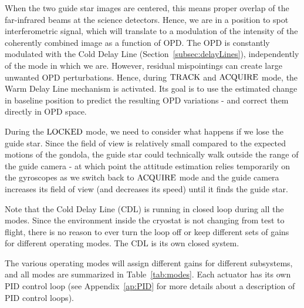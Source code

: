 When the two guide star images are centered, this means proper overlap of the far-infrared beams at the science detectors. Hence, we are in a position to spot interferometric signal, which will translate to a modulation of the intensity of the coherently combined image as a function of OPD. The OPD is constantly modulated with the Cold Delay Line (Section~\ref{subsec:delayLines}), independently of the mode in which we are. However, residual mispointings can create large unwanted OPD perturbations. Hence, during $\textrm{TRACK}$ and $\textrm{ACQUIRE}$ mode, the Warm Delay Line mechanism is activated. Its goal is to use the estimated change in baseline position to predict the resulting OPD variations - and correct them directly in OPD space. 

During the $\textrm{LOCKED}$ mode, we need to consider what happens if we lose the guide star. Since the field of view is relatively small compared to the expected motions of the gondola, the guide star could technically walk outside the range of the guide camera - at which point the attitude estimation relies temporarily on the gyroscopes as we switch back to $\textrm{ACQUIRE}$ mode and the guide camera increases its field of view (and decreases its speed) until it finds the guide star.



Note that the Cold Delay Line (CDL) is running in closed loop during all the modes. Since the environment inside the cryostat is not changing from test to flight, there is no reason to ever turn the loop off or keep different sets of gains for different operating modes. The CDL is its own closed system.

The various operating modes will assign different gains for different subsystems, and all modes are summarized in Table~\ref{tab:modes}. Each actuator has its own PID control loop (see Appendix~\ref{ap:PID} for more details about a description of PID control loops).

